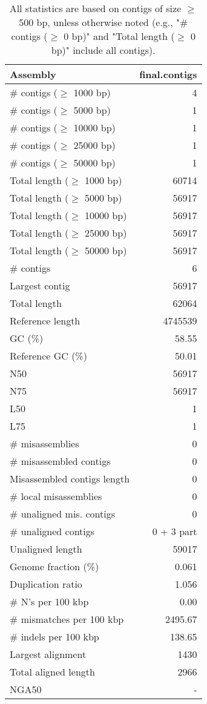 \documentclass[12pt,a4paper]{article}
\begin{document}
\begin{table}[ht]
\begin{center}
\caption{All statistics are based on contigs of size $\geq$ 500 bp, unless otherwise noted (e.g., "\# contigs ($\geq$ 0 bp)" and "Total length ($\geq$ 0 bp)" include all contigs).}
\begin{tabular}{|l*{1}{|r}|}
\hline
Assembly & final.contigs \\ \hline
\# contigs ($\geq$ 1000 bp) & 4 \\ \hline
\# contigs ($\geq$ 5000 bp) & 1 \\ \hline
\# contigs ($\geq$ 10000 bp) & 1 \\ \hline
\# contigs ($\geq$ 25000 bp) & 1 \\ \hline
\# contigs ($\geq$ 50000 bp) & 1 \\ \hline
Total length ($\geq$ 1000 bp) & 60714 \\ \hline
Total length ($\geq$ 5000 bp) & 56917 \\ \hline
Total length ($\geq$ 10000 bp) & 56917 \\ \hline
Total length ($\geq$ 25000 bp) & 56917 \\ \hline
Total length ($\geq$ 50000 bp) & 56917 \\ \hline
\# contigs & 6 \\ \hline
Largest contig & 56917 \\ \hline
Total length & 62064 \\ \hline
Reference length & 4745539 \\ \hline
GC (\%) & 58.55 \\ \hline
Reference GC (\%) & 50.01 \\ \hline
N50 & 56917 \\ \hline
N75 & 56917 \\ \hline
L50 & 1 \\ \hline
L75 & 1 \\ \hline
\# misassemblies & 0 \\ \hline
\# misassembled contigs & 0 \\ \hline
Misassembled contigs length & 0 \\ \hline
\# local misassemblies & 0 \\ \hline
\# unaligned mis. contigs & 0 \\ \hline
\# unaligned contigs & 0 + 3 part \\ \hline
Unaligned length & 59017 \\ \hline
Genome fraction (\%) & 0.061 \\ \hline
Duplication ratio & 1.056 \\ \hline
\# N's per 100 kbp & 0.00 \\ \hline
\# mismatches per 100 kbp & 2495.67 \\ \hline
\# indels per 100 kbp & 138.65 \\ \hline
Largest alignment & 1430 \\ \hline
Total aligned length & 2966 \\ \hline
NGA50 & - \\ \hline
\end{tabular}
\end{center}
\end{table}
\end{document}
